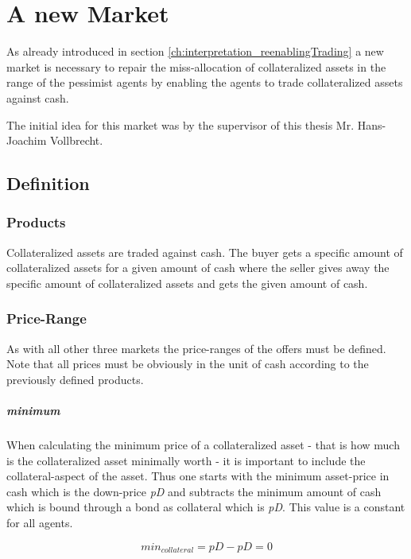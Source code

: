 \documentclass[Bachelorarbeit.tex]{subfiles}
\begin{document}
\graphicspath{{./figures/newMarket/}}	%

\chapter{A new Market}
\label{ch:newMarket}
As already introduced in section \ref{ch:interpretation_reenablingTrading} a new market is necessary to repair the miss-allocation of collateralized assets in the range of the pessimist agents by enabling the agents to trade collateralized assets against cash.

\medskip

The initial idea for this market was by the supervisor of this thesis Mr. Hans-Joachim Vollbrecht.

\section{Definition}
\subsection{Products}
Collateralized assets are traded against cash. The buyer gets a specific amount of collateralized assets for a given amount of cash where the seller gives away the specific amount of collateralized assets and gets the given amount of cash.

\subsection{Price-Range}
As with all other three markets the price-ranges of the offers must be defined. Note that all prices must be obviously in the unit of cash according to the previously defined products.

\paragraph{minimum}
When calculating the minimum price of a collateralized asset - that is how much is the collateralized asset minimally worth - it is important to include the collateral-aspect of the asset. Thus one starts with the minimum asset-price in cash which is the down-price \textit{pD} and subtracts the minimum amount of cash which is bound through a bond as collateral which is \textit{pD}. This value is a constant for all agents.

\begin{equation}
min_{collateral} = \textit{pD} - \textit{pD} = 0
\end{equation}
 
\end{document}
